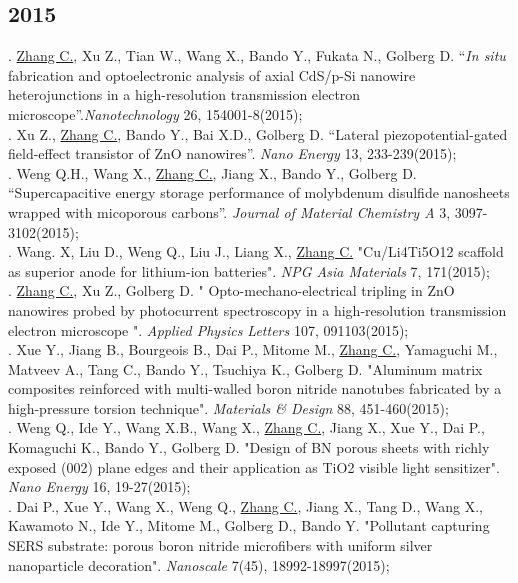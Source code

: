 \subsection*{2015}
. \underline{Zhang C.}, Xu Z., Tian W., Wang X., Bando Y., Fukata N., Golberg D. “{\em In situ} fabrication and optoelectronic analysis of axial CdS/p-Si nanowire heterojunctions in a high-resolution transmission electron microscope”.{\em Nanotechnology} 26, 154001-8(2015);\\[5pt]
. Xu Z., \underline{Zhang C.}, Bando Y., Bai X.D., Golberg D. “Lateral piezopotential-gated field-effect transistor of ZnO nanowires”. {\em Nano Energy} 13, 233-239(2015);\\[5pt]
. Weng Q.H., Wang X., \underline{Zhang C.}, Jiang X., Bando Y., Golberg D. “Supercapacitive energy storage performance of molybdenum disulfide nanosheets wrapped with micoporous carbons”. {\em Journal of Material Chemistry A} 3, 3097-3102(2015); \\[5pt]
. Wang. X, Liu D., Weng Q., Liu J., Liang X., \underline{Zhang C.} "Cu/Li4Ti5O12 scaffold as superior anode for lithium-ion batteries". {\em NPG Asia Materials} 7, 171(2015); \\[5pt]
. \underline{Zhang C.}, Xu Z., Golberg D. " Opto-mechano-electrical tripling in ZnO nanowires probed by photocurrent spectroscopy in a high-resolution transmission electron microscope ".  {\em Applied Physics Letters} 107, 091103(2015); \\[5pt] 
. Xue Y., Jiang B., Bourgeois B., Dai P., Mitome M., \underline{Zhang C.}, Yamaguchi M., Matveev A., Tang C., Bando Y., Tsuchiya K., Golberg D. "Aluminum matrix composites reinforced with multi-walled boron nitride nanotubes fabricated by a high-pressure torsion technique". {\em Materials \& Design} 88, 451-460(2015);\\[5pt]
. Weng Q., Ide Y., Wang X.B., Wang X., \underline{Zhang C.}, Jiang X., Xue Y., Dai P., Komaguchi K., Bando Y., Golberg D. "Design of BN porous sheets with richly exposed (002) plane edges and their application as TiO2 visible light sensitizer". {\em Nano Energy} 16, 19-27(2015);\\[5pt]
. Dai P., Xue Y., Wang X., Weng Q., \underline{Zhang C.}, Jiang X., Tang D., Wang X., Kawamoto N., Ide Y., Mitome M., Golberg D., Bando Y. "Pollutant capturing SERS substrate: porous boron nitride microfibers with uniform silver nanoparticle decoration". {\em Nanoscale} 7(45), 18992-18997(2015);\\

